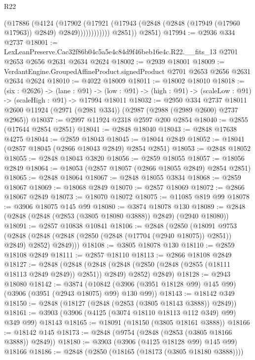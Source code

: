 \begin{lexlean}{R22}
\begin{coremodule}
                      (@17886
                        (@4124
                          (@17902
                            (@17921
                              (@17943
                                (@2848 (@2848 (@17949 (@17960 @17963)) @2849) @2849))))))))))))
          @2851))
      @2851)
@17994 := @2936 @334 @2737
@18001 := LexLeanPreserve.Cac32f86b04c5a5e4c84d9f46beb16e4c.R22.__fits_13
    @2701
    @2653
    @2656
    @2631
    @2634
    @2624
@18002 := @2939 @18001
@18009 := VerdantEngine.GroupedAffineProduct.signedProduct @2701 @2653 @2656 @2631 @2634 @2624
@18010 := @4022 @18009
@18011 := @18002 @18010
@18018 := (six : @2626) ->
  (lane : @91) ->
  (low : @91) -> (high : @91) -> (scaleLow : @91) -> (scaleHigh : @91) -> @17994 @18011
@18032 := @2950
    @334
    @2737
    @18011
    @2600
    @11924
    (@2971 (@2981 @334))
    (@2987 (@2988 (@2989 @2600) @2737 @2965))
@18037 := @2997 @11924 @2318 @2597 @200 @2854
@18040 := @2855 (@17644 @2854 @2851)
@18041 := @2848 @18040
@18043 := @2848 @17638 @4275
@18044 := @2859 @18043
@18045 := @18044 @2849
@18052 := @18041 (@2857 @18045 (@2866 @18043 @2849) @2854 @2851)
@18053 := @2848 @18052
@18055 := @2848 @18043 @3820
@18056 := @2859 @18055
@18057 := @18056 @2849
@18064 := @18053 (@2857 @18057 (@2866 @18055 @2849) @2854 @2851)
@18065 := @2848 @18064
@18067 := @2848 @18055 @3834
@18068 := @2859 @18067
@18069 := @18068 @2849
@18070 := @2857 @18069
@18072 := @2866 @18067 @2849
@18073 := @18070 @18072
@18075 := @11085 @819 @99
@18078 := @3906 @18075 @145 @99
@18080 := @3874 @18078 @130
@18089 := @2848 (@2848 (@2848 (@2853 (@3805 @18080 @3888)) @2849) (@2940 @18080))
@18091 := @2857 @10838 @10841
@18106 := @2848
    (@2850
      (@18091
        @9753
        (@2848 (@2848 (@2848 (@2850 (@2848 (@17704 (@2940 @18075)) @2851)) @2849) @2852) @2849)))
@18108 := @3805 @18078 @130
@18110 := @2859 @18108 @2849
@18111 := @2857 @18110
@18113 := @2866 @18108 @2849
@18127 := @2848
    (@2848
      (@2848 (@2848 (@2850 (@2848 (@2855 (@18111 @18113 @2849 @2849)) @2851)) @2849) @2852)
      @2849)
@18128 := @2943 @18080
@18142 := @3874
    (@10842 (@3906 (@3951 @18128 @99) @145 @99) (@3906 (@3951 (@2943 @18075) @99) @130 @99))
@18143 := @18142 @349
@18150 := @2848 (@18127 (@2848 (@2853 (@3805 @18143 @3888)) @2849))
@18161 := @3903 (@3906 (@4125 (@3074 @18110 @18113 @112 @349) @99) @349 @99) @18143
@18165 := @18091 (@18150 (@3805 @18161 @3888))
@18166 := @18142 @145
@18173 := @2848 (@9754 (@2848 (@2853 (@3805 @18166 @3888)) @2849))
@18180 := @3903 (@3906 (@4125 @18128 @99) @145 @99) @18166
@18186 := @2848 (@2850 (@18165 (@18173 (@3805 @18180 @3888))))

\end{coremodule}
\end{lexlean}
